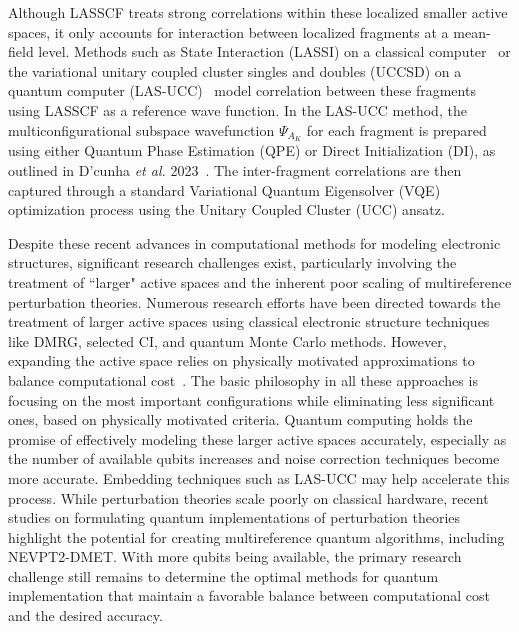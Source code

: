 Although LASSCF treats strong correlations within these localized smaller active spaces, it only accounts for interaction between localized fragments at a mean-field level.
Methods such as State Interaction (LASSI) on a classical computer~\cite{Pandharkar2022} or the variational unitary coupled cluster singles and doubles (UCCSD) on a quantum computer (LAS-UCC)~\cite{Otten2022} model correlation between these fragments using LASSCF as a reference wave function.
In the LAS-UCC method, the multiconfigurational subspace wavefunction $\Psi_{A_K}$ for each fragment is prepared using either Quantum Phase Estimation (QPE) or Direct Initialization (DI), as outlined in D'cunha \textit{et al.} 2023~\cite{Dcunha2023StatePreparation}.
The inter-fragment correlations are then captured through a standard Variational Quantum Eigensolver (VQE) optimization process using the Unitary Coupled Cluster (UCC) ansatz.

Despite these recent advances in computational methods for modeling electronic structures, significant research challenges exist, particularly involving the treatment of ``larger" active spaces and the inherent poor scaling of multireference perturbation theories. Numerous research efforts have been directed towards the treatment of larger active spaces using classical electronic structure techniques like DMRG, selected CI, and quantum Monte Carlo methods. However, expanding the active space relies on physically motivated approximations to balance computational cost~\cite{ciapprox-1,Holmes2016, Stein2019, Booth2009,ciapprox-2}. The basic philosophy in all these approaches is focusing on the most important configurations while eliminating less significant ones, based on physically motivated criteria.
Quantum computing holds the promise of effectively modeling these larger active spaces accurately, especially as the number of available qubits increases and noise correction techniques become more accurate.
Embedding techniques such as LAS-UCC may help accelerate this process.
While perturbation theories scale poorly on classical hardware, recent studies on formulating quantum implementations of perturbation theories\cite{Li2023} highlight the potential for creating multireference quantum algorithms, including NEVPT2-DMET.
With more qubits being available, the primary research challenge still remains to determine the optimal methods for quantum implementation that maintain a favorable balance between computational cost and the desired accuracy.


